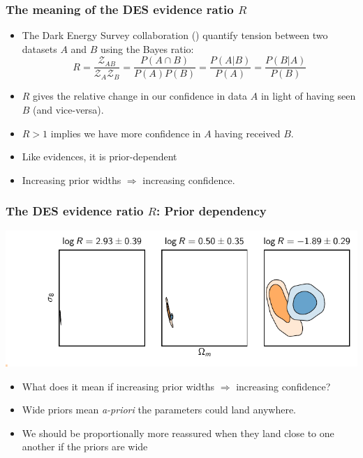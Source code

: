 \documentclass[aspectratio=169, handout]{beamer}
\begin{document}
\begin{frame}
    \frametitle{The meaning of the DES evidence ratio $R$}
    \begin{itemize}
        \item The Dark Energy Survey collaboration () quantify tension between two datasets $A$ and $B$ using the Bayes ratio:
            \[
                R = \frac{\mathcal{Z}_{AB}}{\mathcal{Z}_A \mathcal{Z}_B} = \frac{P(A\cap B)}{P(A)P(B)} = \frac{P(A|B)}{P(A)} = \frac{P(B|A)}{P(B)}
            \]
        \item $R$ gives the relative change in our confidence in data $A$ in light of having seen $B$ (and vice-versa).
        \item $R>1$ implies we have more confidence in $A$ having received $B$.
        \item Like evidences, it is prior-dependent
        \item Increasing prior widths $\Rightarrow$ increasing confidence.
    \end{itemize}
\end{frame}

\begin{frame}
    \frametitle{The DES evidence ratio $R$: Prior dependency}
    {\includegraphics[trim=0.6in 0.3in 0in 0in]{./plots/prior_dependency.pdf}}
    \begin{itemize}
        \item What does it mean if increasing prior widths $\Rightarrow$ increasing confidence? 
        \item Wide priors mean {\em a-priori\/} the parameters could land anywhere.
        \item We should be proportionally more reassured when they land close to one another if the priors are wide
    \end{itemize}
\end{frame}
\end{document}
